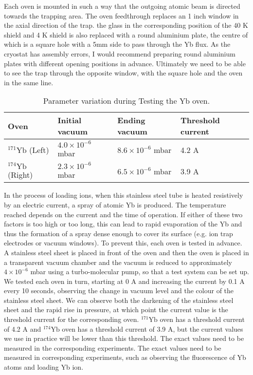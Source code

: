 Each oven is mounted in such a way that the outgoing atomic beam is directed towards the trapping area. The oven feedthrough replaces an 1 inch window in the axial direction of the trap. the glass in the corresponding position of the 40 K shield and 4 K shield is also replaced with a round aluminium plate, the centre of which is a square hole with a 5mm side to pass through the Yb flux. As the cryostat has assembly errors, I would recommend preparing round aluminium plates with different opening positions in advance. Ultimately we need to be able to see the trap through the opposite window, with the square hole and the oven in the same line.

\begin{table}
    \centering
    \caption{Parameter variation during Testing the Yb oven.}
    \begin{tabular}{llll}
        \toprule
        Oven                            & Initial vacuum              & Ending vacuum               & Threshold current \\

        \midrule
        ${ }^{171} \mathrm{Yb}$ (Left)  & $4.0 \times {10}^{-6}$ mbar & $8.6 \times {10}^{-6}$ mbar & 4.2 A             \\
        ${ }^{174} \mathrm{Yb}$ (Right) & $2.3 \times {10}^{-6}$ mbar & $6.5 \times {10}^{-6}$ mbar & 3.9 A             \\
        \bottomrule
    \end{tabular}
\end{table}


In the process of loading ions, when this stainless steel tube is heated resistively by an electric current, a spray of atomic Yb is produced. The temperature reached depends on the current and the time of operation. If either of these two factors is too high or too long, this can lead to rapid evaporation of the Yb and thus the formation of a spray dense enough to cover its surface (e.g. ion trap electrodes or vacuum windows). To prevent this, each oven is tested in advance. A stainless steel sheet is placed in front of the oven and then the oven is placed in a transparent vacuum chamber and the vacuum is reduced to approximately $4 \times {10}^{-6}$ mbar using a turbo-molecular pump, so that a test system can be set up. We tested each oven in turn, starting at 0 A and increasing the current by 0.1 A every 10 seconds, observing the change in vacuum level and the colour of the stainless steel sheet. We can observe both the darkening of the stainless steel sheet and the rapid rise in pressure, at which point the current value is the threshold current for the corresponding oven. ${ }^{171} \mathrm{Yb}$ oven has a threshold current of 4.2 A and ${ }^{174} \mathrm{Yb}$ oven has a threshold current of 3.9 A, but the current values we use in practice will be lower than this threshold. The exact values need to be measured in the corresponding experiments. The exact values need to be measured in corresponding experiments, such as observing the fluorescence of Yb atoms and loading Yb ion.



